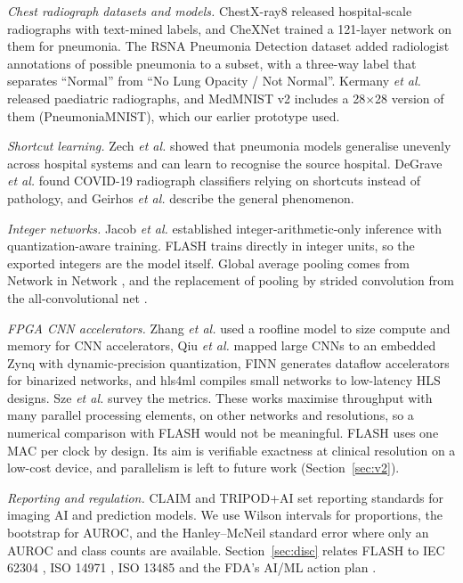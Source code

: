 \documentclass[conference]{IEEEtran}
\begin{document}
\textit{Chest radiograph datasets and models.} ChestX-ray8 \cite{wang2017chestxray8} released
hospital-scale radiographs with text-mined labels, and CheXNet \cite{rajpurkar2017chexnet}
trained a 121-layer network on them for pneumonia. The RSNA Pneumonia Detection dataset
\cite{shih2019rsna} added radiologist annotations of possible pneumonia to a subset, with a
three-way label that separates ``Normal'' from ``No Lung Opacity / Not Normal''. Kermany
\textit{et al.} \cite{kermany2018} released paediatric radiographs, and MedMNIST v2
\cite{yang2023medmnist} includes a 28$\times$28 version of them (PneumoniaMNIST), which our
earlier prototype used.

\textit{Shortcut learning.} Zech \textit{et al.} \cite{zech2018} showed that pneumonia models
generalise unevenly across hospital systems and can learn to recognise the source hospital.
DeGrave \textit{et al.} \cite{degrave2021} found COVID-19 radiograph classifiers relying on
shortcuts instead of pathology, and Geirhos \textit{et al.} \cite{geirhos2020} describe the
general phenomenon.

\textit{Integer networks.} Jacob \textit{et al.} \cite{jacob2018} established
integer-arithmetic-only inference with quantization-aware training. FLASH trains directly in
integer units, so the exported integers are the model itself. Global average pooling comes from
Network in Network \cite{lin2014nin}, and the replacement of pooling by strided convolution from
the all-convolutional net \cite{springenberg2015}.

\textit{FPGA CNN accelerators.} Zhang \textit{et al.} \cite{zhang2015} used a roofline model to
size compute and memory for CNN accelerators, Qiu \textit{et al.} \cite{qiu2016} mapped large
CNNs to an embedded Zynq with dynamic-precision quantization, FINN \cite{umuroglu2017finn}
generates dataflow accelerators for binarized networks, and hls4ml \cite{duarte2018hls4ml}
compiles small networks to low-latency HLS designs. Sze \textit{et al.} \cite{sze2017} survey
the metrics. These works maximise throughput with many parallel processing elements, on other
networks and resolutions, so a numerical comparison with FLASH would not be meaningful. FLASH
uses one MAC per clock by design. Its aim is verifiable exactness at clinical resolution on a
low-cost device, and parallelism is left to future work (Section~\ref{sec:v2}).

\textit{Reporting and regulation.} CLAIM \cite{mongan2020claim} and TRIPOD+AI
\cite{collins2024tripodai} set reporting standards for imaging AI and prediction models. We use
Wilson intervals \cite{wilson1927} for proportions, the bootstrap \cite{efron1979} for AUROC,
and the Hanley--McNeil standard error \cite{hanley1982} where only an AUROC and class counts are
available. Section~\ref{sec:disc} relates FLASH to IEC 62304 \cite{iec62304}, ISO 14971
\cite{iso14971}, ISO 13485 \cite{iso13485} and the FDA's AI/ML action plan
\cite{fda2021aiml}.
\end{document}
